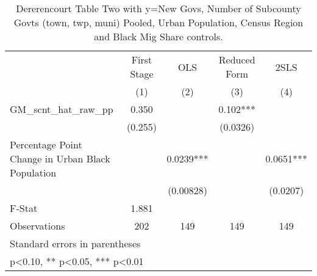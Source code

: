 \begin{table}[htbp]\centering
\def\sym#1{\ifmmode^{#1}\else\(^{#1}\)\fi}
\caption{Dererencourt Table Two with y=New Govs, Number of Subcounty Govts (town, twp, muni) Pooled, Urban Population, Census Region and Black Mig Share controls.}
\begin{tabular}{l*{4}{c}}
\toprule
                    & First Stage   &         OLS   &Reduced Form   &        2SLS   \\
                    &\multicolumn{1}{c}{(1)}   &\multicolumn{1}{c}{(2)}   &\multicolumn{1}{c}{(3)}   &\multicolumn{1}{c}{(4)}   \\
\midrule
GM\_scnt\_hat\_raw\_pp  &       0.350   &               &       0.102***&               \\
                    &     (0.255)   &               &    (0.0326)   &               \\
\addlinespace
Percentage Point Change in Urban Black Population&               &      0.0239***&               &      0.0651***\\
                    &               &   (0.00828)   &               &    (0.0207)   \\
\midrule
F-Stat              &       1.881   &               &               &               \\
Observations        &         202   &         149   &         149   &         149   \\
\bottomrule
\multicolumn{5}{l}{\footnotesize Standard errors in parentheses}\\
\multicolumn{5}{l}{\footnotesize * p<0.10, ** p<0.05, *** p<0.01}\\
\end{tabular}
\end{table}
